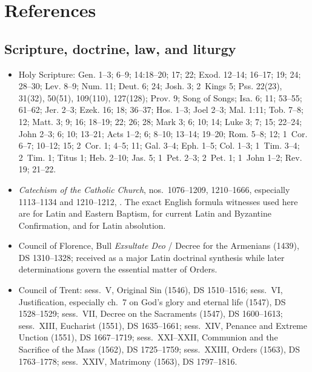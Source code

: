 \section{References}

\subsection*{Scripture, doctrine, law, and liturgy}
{\footnotesize
\begin{itemize}[nosep]
\item Holy Scripture: Gen. 1--3; 6--9; 14:18--20; 17; 22; Exod. 12--14; 16--17; 19; 24; 28--30; Lev. 8--9; Num. 11; Deut. 6; 24; Josh. 3; 2~Kings 5; Pss. 22(23), 31(32), 50(51), 109(110), 127(128); Prov. 9; Song of Songs; Isa. 6; 11; 53--55; 61--62; Jer. 2--3; Ezek. 16; 18; 36--37; Hos. 1--3; Joel 2--3; Mal. 1:11; Tob. 7--8; 12; Matt. 3; 9; 16; 18--19; 22; 26; 28; Mark 3; 6; 10; 14; Luke 3; 7; 15; 22--24; John 2--3; 6; 10; 13--21; Acts 1--2; 6; 8--10; 13--14; 19--20; Rom. 5--8; 12; 1~Cor. 6--7; 10--12; 15; 2~Cor. 1; 4--5; 11; Gal. 3--4; Eph. 1--5; Col. 1--3; 1~Tim. 3--4; 2~Tim. 1; Titus 1; Heb. 2--10; Jas. 5; 1~Pet. 2--3; 2~Pet. 1; 1~John 1--2; Rev. 19; 21--22.
\item \emph{Catechism of the Catholic Church}, nos.~1076--1209, 1210--1666, especially 1113--1134 and 1210--1212, . The exact English formula witnesses used here are  for Latin and Eastern Baptism,  for current Latin and Byzantine Confirmation, and  for Latin absolution.
\item Council of Florence, Bull \emph{Exsultate Deo} / Decree for the Armenians (1439), DS 1310--1328; received as a major Latin doctrinal synthesis while later determinations govern the essential matter of Orders.
\item Council of Trent: sess.~V, Original Sin (1546), DS 1510--1516; sess.~VI, Justification, especially ch.~7 on God's glory and eternal life (1547), DS 1528--1529; sess.~VII, Decree on the Sacraments (1547), DS 1600--1613; sess.~XIII, Eucharist (1551), DS 1635--1661; sess.~XIV, Penance and Extreme Unction (1551), DS 1667--1719; sess.~XXI--XXII, Communion and the Sacrifice of the Mass (1562), DS 1725--1759; sess.~XXIII, Orders (1563), DS 1763--1778; sess.~XXIV, Matrimony (1563), DS 1797--1816.

\end{itemize}}
